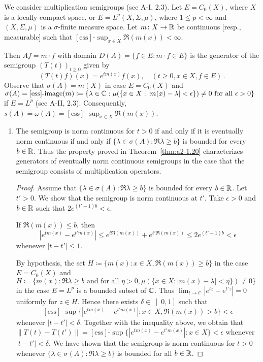 \begin{example}\label{ex:a2-1.28}
We consider multiplication semigroups (see A-I, 2.3).
Let $E = C_{0}(X)$, where $X$ is a locally compact space, or $E = L^{p}(X,\Sigma,\mu)$, where $1 \leq p < \infty$ and $(X,\Sigma,\mu)$ is a $\sigma$-finite measure space.
Let $m \colon X \to \mathbb{R}$ be continuous [resp., measurable] such that $[\text{ess}]\text{-}\sup_{x \in X} \Re(m(x)) < \infty$.

Then $Af = m \cdot f$ with domain $D(A) = \{f \in E : m \cdot f \in E\}$ is the generator of the semigroup $(T(t))_{t \geq 0}$ given by
\[
    (T(t)f)(x) = e^{tm(x)}f(x), \quad (t \geq 0, x \in X, f \in E )\, .
\]
Observe that $\sigma(A) = \overline{m(X)}$ in case $E = C_{0}(X)$ 
and 
$\sigma(A) = [\text{ess}]\text{-}\text{image}(m) \coloneqq \{\lambda \in \mathbb{C} : \mu(\{x \in X : |m(x)-\lambda| < \epsilon\}) \neq 0 \text{ for all } \epsilon > 0\}$ 
if $E = L^{p}$ (see A-II, 2.3).
Consequently, $s(A) = \omega(A) = [\text{ess}]\text{-}\sup_{x \in X} \Re(m(x))$.

\begin{enumerate}[\upshape (i), wide, labelsep=1em, itemsep=1ex]
\item \label{ex:a2-1.28-1}
The semigroup is norm continuous for $t > 0$ if and only if it is eventually norm continuous if and only if 
$\{\lambda \in \sigma(A) : \Re\lambda \geq b\}$ 
is bounded for every $b \in \mathbb{R}$.
Thus the property proved in Theorem~\ref{thm:a2-1.20}   characterizes generators of eventually norm continuous semigroups in the case that the semigroup consists of multiplication operators.
\begin{proof}
Assume that $\{\lambda \in \sigma(A) : \Re\lambda \geq b\}$ is bounded for every $b \in \mathbb{R}$.
Let $t' > 0$.
We show that the semigroup is norm continuous at $t'$.
Take $\epsilon > 0$ and $b \in \mathbb{R}$ such that $2e^{(t'+1)b} < \epsilon$.

If $\Re(m(x)) \leq b$, then
\[
    |e^{tm(x)} - e^{t'm(x)}| \leq e^{t\Re(m(x))} + e^{t'\Re(m(x))} \leq 2e^{(t'+1)b} < \epsilon
\]
whenever $|t-t'| \leq 1$.

By hypothesis, the set 
$H \coloneqq \{m(x) : x \in X, \Re(m(x)) \geq b\}$ 
in the case $E = C_{0}(X)$ 
and $H \coloneqq \{m(x) : \Re\lambda \geq b \text{ and for all } \eta > 0, 
\mu(\{x \in X : |m(x)-\lambda| < \eta \}) \neq 0\}$
in the case $E = L^{p}$ 
is a bounded subset of $\mathbb{C}$.
Thus $\lim_{t \to t'} |e^{tz} - e^{t'z}| = 0$ 
uniformly for $z \in H$.
Hence there exists $\delta \in \left]0,1\right]$ such that
\[
[\text{ess}]\text{-}\sup\{|e^{tm(x)} - e^{t'm(x)}| : x \in X, \Re(m(x)) > b\} < \epsilon
\] 
whenever $|t-t'| < \delta$.
Together with the inequality above, we obtain that 
$\|T(t) - T(t')\| = [\text{ess}]\text{-}\sup\{|e^{tm(x)} - e^{t'm(x)}| : x \in X\} < \epsilon$ 
whenever $|t-t'| < \delta$.
We have shown that the semigroup is norm continuous for $t > 0$ whenever $\{\lambda \in \sigma(A) : \Re\lambda \geq b\}$ is bounded for all $b \in \mathbb{R}$.
\end{proof}


\end{enumerate}
\end{example}
